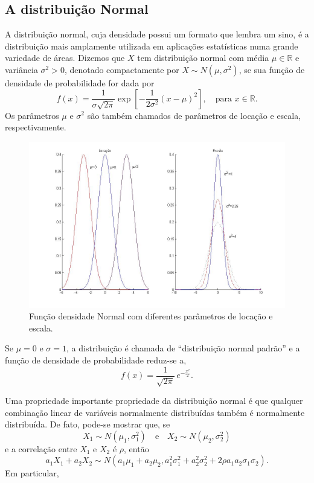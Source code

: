 \documentclass[
]{book}
\theoremstyle{definition}
\theoremstyle{definition}
\theoremstyle{definition}
\theoremstyle{remark}
\begin{document}
\hypertarget{a-distribuiuxe7uxe3o-normal}{%
\subsection{A distribuição Normal}\label{a-distribuiuxe7uxe3o-normal}}

A distribuição normal, cuja densidade possui um formato que lembra um sino, é a distribuição
mais amplamente utilizada em aplicações estatísticas numa grande variedade de áreas. Dizemos que \(X\) tem distribuição normal com média \(\mu\in\mathbb{R}\) e variância \(\sigma^2>0\), denotado compactamente por \(X\sim N(\mu,\sigma^2)\), se sua função de densidade de probabilidade for dada por
\[f(x)=\frac{1}{\sigma \sqrt{2\pi}}\exp\left[-\frac{1}{2\sigma^2}(x-\mu)^2\right], \quad \mbox{para } x\in\mathbb{R}.\]
Os parâmetros \(\mu\) e \(\sigma^2\) são também
chamados de parâmetros de locação e escala, respectivamente.

\begin{figure}

{\centering \includegraphics[width=0.8\linewidth]{Figuras/Loc_Esc_Normal} 

}

\caption{Função densidade Normal com diferentes parâmetros de locação  e escala.}\label{fig:LEN}
\end{figure}

Se \(\mu = 0\) e \(\sigma = 1\), a distribuição é chamada de ``distribuição normal padrão''
e a função de densidade de probabilidade reduz-se a,
\[f(x) = \frac{1}{\sqrt{2\pi}} \, e^{-\frac{x^2}{2}}.\]

Uma propriedade importante propriedade da distribuição normal é que qualquer
combinação linear de variáveis normalmente distribuídas também é
normalmente distribuída. De fato, pode-se mostrar que, se
\[X_1 \sim N(\mu_1,\sigma^2_1)
\quad \mbox{e} \quad X_2 \sim N(\mu_2,\sigma^2_2)\]
e a correlação entre \(X_1\) e \(X_2\) é \(\rho\), então
\[a_1X_1+a_2X_2 \sim N(a_1\mu_1+a_2\mu_2, a_1^2\sigma^2_1+a_2^2\sigma^2_2+2\rho
a_1a_2\sigma_1\sigma_2).\]
Em particular,
\end{document}
